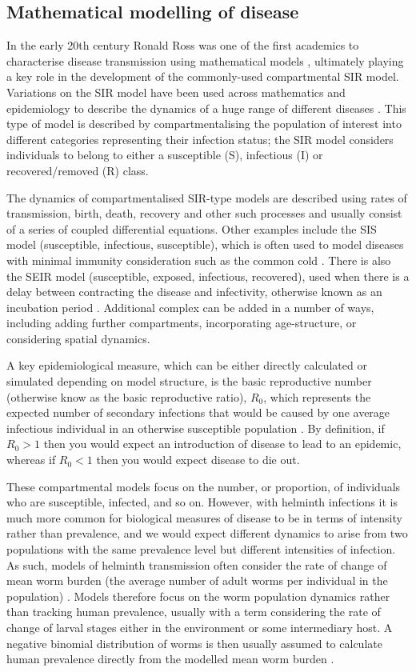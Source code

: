 \subsection{Mathematical modelling of disease}

In the early 20th century Ronald Ross was one of the first academics to characterise disease transmission using mathematical models \cite{Ross1911}, ultimately playing a key role in the development of the commonly-used compartmental SIR model. Variations on the SIR model have been used across mathematics and epidemiology to describe the dynamics of a huge range of different diseases \cite{Weiss2013}. This type of model is described by compartmentalising the population of interest into different categories representing their infection status; the SIR model considers individuals to belong to either a susceptible (S), infectious (I) or recovered/removed (R) class.

The dynamics of compartmentalised SIR-type models are described using rates of transmission, birth, death, recovery and other such processes and usually consist of a series of coupled differential equations. Other examples include the SIS model (susceptible, infectious, susceptible), which is often used to model diseases with minimal immunity consideration such as the common cold \cite{Banasiak2013}. There is also the SEIR model (susceptible, exposed, infectious, recovered), used when there is a delay between contracting the disease and infectivity, otherwise known as an incubation period \cite{Bolker1993}. Additional complex can be added in a number of ways, including adding further compartments, incorporating age-structure, or considering spatial dynamics.

A key epidemiological measure, which can be either directly calculated or simulated depending on model structure, is the basic reproductive number (otherwise know as the basic reproductive ratio), $R_0$, which represents the expected number of secondary infections that would be caused by one average infectious individual in an otherwise susceptible population \cite{Anderson1992}. By definition, if $R_0>1$ then you would expect an introduction of disease to lead to an epidemic, whereas if $R_0<1$ then you would expect disease to die out.

These compartmental models focus on the number, or proportion, of individuals who are susceptible, infected, and so on. However, with helminth infections it is much more common for biological measures of disease to be in terms of intensity rather than prevalence, and we would expect different dynamics to arise from two populations with the same prevalence level but different intensities of infection. As such, models of helminth transmission often consider the rate of change of mean worm burden (the average number of adult worms per individual in the population) \cite{Anderson1992}. Models therefore focus on the worm population dynamics rather than tracking human prevalence, usually with a term considering the rate of change of larval stages either in the environment or some intermediary host. A negative binomial distribution of worms is then usually assumed to calculate human prevalence directly from the modelled mean worm burden \cite{Anderson1992}.


